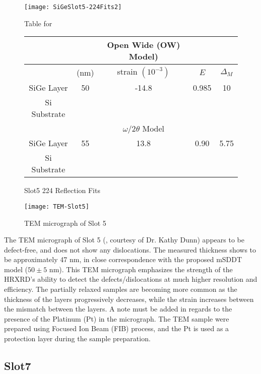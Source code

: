 \begin{figure}[h]%
\caption{Slot5 224 Reflection Fits}
\label{Slot5-224}
\begin{minipage}{0.85\linewidth}
\texttt{[image: SiGeSlot5-224Fits2]}
\end{minipage}
\begin{minipage}{\linewidth}
\centering
\vspace{10pt}
Table for \\
\vspace{5pt}
\begin{tabular}{c|cccc}
			& 	&Open Wide (OW) Model)	 \\
\hline
			&	(nm)	&	strain	 $(10^{-3})$&	$E$  &  $\Delta_M$\\
\hline
SiGe Layer		&  	50	&      -14.8	 & 0.985 & 10	\\
Si Substrate		&	\textemdash & \textemdash&\textemdash\ &\textemdash	\\
\hline
			& &$\omega/2\theta$ Model \\
\hline
SiGe Layer		&	55	& 13.8	& 0.90	& 5.75	\\
Si Substrate		&	\textemdash & \textemdash&\textemdash\ &\textemdash
\end{tabular}
\end{minipage}
\end{figure}

\begin{figure}[h]
\caption{TEM micrograph of Slot 5}
\label{TEM-Slot5}
\texttt{[image: TEM-Slot5]}
\end{figure}

The TEM micrograph of  Slot 5 (, courtesy of Dr. Kathy Dunn) appears to be defect-free, and does not show any dislocations.  The measured thickness shows to be approximately 47 nm, in close correspondence with the proposed mSDDT model ($50\pm5$ nm).    This TEM micrograph emphasizes the strength of the HRXRD's ability to detect the defects/dislocations at much higher resolution and efficiency.  The partially relaxed samples are becoming more common as the thickness of the layers progressively decreases, while the strain increases between the mismatch between the layers. A note must be added in regards to the presence of the Platinum (Pt) in the micrograph.  The TEM sample were prepared using Focused Ion Beam (FIB) process, and the Pt is used as a protection layer during the sample preparation.


\subsection{Slot7}

